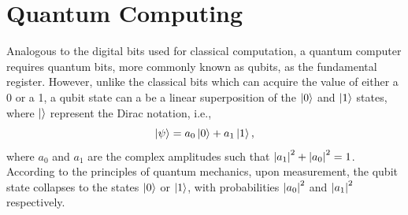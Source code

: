 \documentclass[../main.tex]{subfiles}
\begin{document}
\section{Quantum Computing}
Analogous to the digital bits used for classical computation, a quantum computer requires quantum bits, more commonly known as qubits, as the fundamental register. However, unlike the classical bits which can acquire the value of either a 0 or a 1, a qubit state can a be a linear superposition of the $\ket{0}$ and $\ket{1}$ states, where $\ket{}$ represent the Dirac notation, i.e.,
\begin{equation}
\ket{\psi}= a_0 \ket{0} + a_1 \ket{1},  \label{eq:b1}
\end{equation}
where $a_0$ and $a_1$ are the complex amplitudes such that ${\abs{a_1}}^2 +{\abs{a_0}}^2 =1$. According to the principles of quantum mechanics, upon measurement, the qubit state collapses to the states $\ket{0}$ or $\ket{1}$, with probabilities ${\abs{a_0}}^2$ and ${\abs{a_1}}^2$ respectively. 
\end{document}
